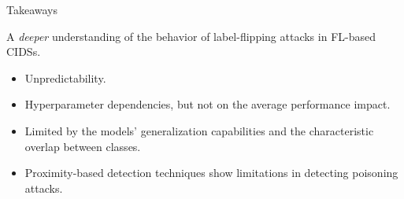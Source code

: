 \begin{frame}{Takeaways}

  A \emph{deeper} understanding of the behavior of label-flipping attacks in FL-based CIDSs.
  \begin{itemize}\small
    \item Unpredictability.
    \item Hyperparameter dependencies, but not on the average performance impact.
    \item Limited by the models' generalization capabilities and the characteristic overlap between classes.
    \item Proximity-based detection techniques show limitations in detecting poisoning attacks.
  \end{itemize}
  
\end{frame}





